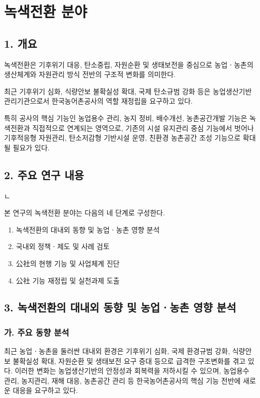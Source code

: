 \section*{녹색전환 분야}

\subsection*{1. 개요}

녹색전환은 기후위기 대응, 탄소중립, 자원순환 및 생태보전을 중심으로
농업ㆍ농촌의 생산체계와 자원관리 방식 전반의 구조적 변화를 의미한다.

최근 기후위기 심화, 식량안보 불확실성 확대, 국제 탄소규범 강화 등은
농업생산기반 관리기관으로서 한국농어촌공사의 역할 재정립을 요구하고 있다.

특히 공사의 핵심 기능인 농업용수 관리, 농지 정비, 배수개선,
농촌공간개발 기능은 녹색전환과 직접적으로 연계되는 영역으로,
기존의 시설 유지관리 중심 기능에서 벗어나
기후적응형 자원관리, 탄소저감형 기반시설 운영,
친환경 농촌공간 조성 기능으로 확대될 필요가 있다.

\subsection*{2. 주요 연구 내용}ㄴ

본 연구의 녹색전환 분야는 다음의 네 단계로 구성한다.

\begin{enumerate}
    \item 녹색전환의 대내외 동향 및 농업ㆍ농촌 영향 분석
    \item 국내외 정책ㆍ제도 및 사례 검토
    \item 公社의 현행 기능 및 사업체계 진단
    \item 公社 기능 재정립 및 실천과제 도출
\end{enumerate}

\subsection*{3. 녹색전환의 대내외 동향 및 농업ㆍ농촌 영향 분석}

\subsubsection*{가. 주요 동향 분석}

최근 농업ㆍ농촌을 둘러싼 대내외 환경은 기후위기 심화, 국제 환경규범 강화,
식량안보 불확실성 확대, 자원순환 및 생태보전 요구 증대 등으로 급격한 구조변화를 겪고 있다.
이러한 변화는 농업생산기반의 안정성과 회복력을 저하시킬 수 있으며,
농업용수 관리, 농지관리, 재해 대응, 농촌공간 관리 등
한국농어촌공사의 핵심 기능 전반에 새로운 대응을 요구하고 있다.

